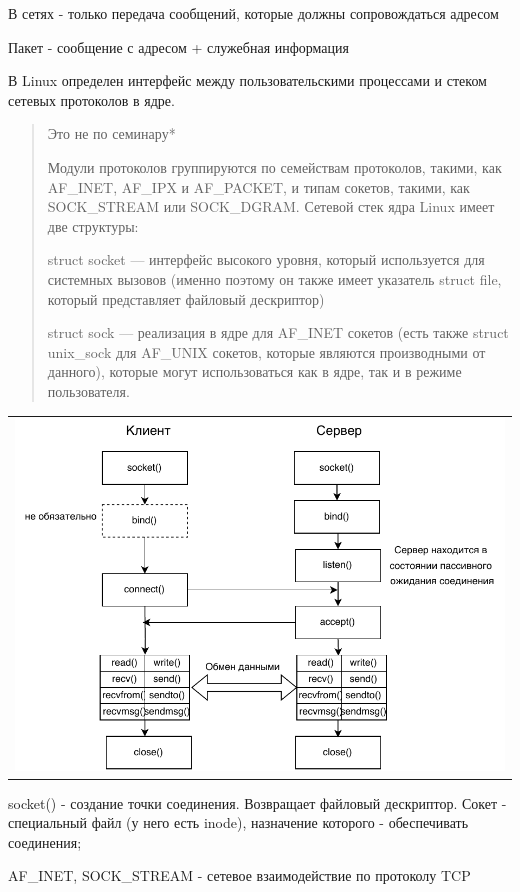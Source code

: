 В сетях - только передача сообщений, которые должны сопровождаться адресом

Пакет - сообщение с адресом + служебная информация 

В Linux определен интерфейс между пользовательскими процессами и стеком сетевых протоколов в ядре.

\begin{quote}
Это не по семинару*

Модули протоколов группируются по семействам протоколов, такими, как AF\_INET, AF\_IPX и AF\_PACKET, и типам сокетов, такими, как \\ SOCK\_STREAM или SOCK\_DGRAM. Сетевой стек ядра Linux имеет две структуры:

struct socket — интерфейс высокого уровня, который используется для системных вызовов (именно поэтому он также имеет указатель struct file, который представляет файловый дескриптор)

struct sock — реализация в ядре для AF\_INET сокетов (есть также struct unix\_sock для AF\_UNIX сокетов, которые являются производными от данного), которые могут использоваться как в ядре, так и в режиме пользователя.
\end{quote}

\begin{table}[H]
  \centering
  \begin{tabular}{p{1\linewidth}}
    \centering
    \includegraphics[width=0.8\linewidth]{./images/4.pdf}
  \end{tabular}
\end{table}

socket() - создание точки соединения. Возвращает файловый дескриптор. Сокет - специальный файл (у него есть inode), назначение которого - обеспечивать соединения;

AF\_INET, SOCK\_STREAM - сетевое взаимодействие по протоколу TCP

